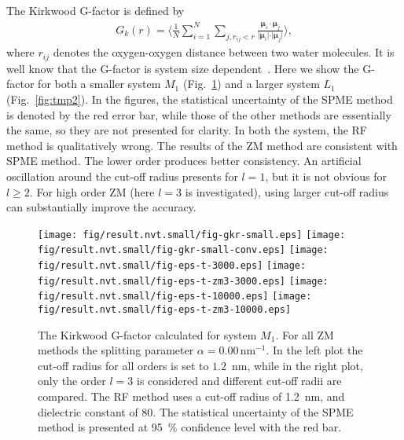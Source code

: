\documentclass[aip,jcp,a4paper,preprint,unsortedaddress,onecolumn,fleqn]{revtex4-1}
\newcommand{\systemmb}{M_1}
\newcommand{\systemlb}{L_1}
\begin{document}
The Kirkwood G-factor is defined by~\cite{vanderSpoel2006origin}
\begin{align}
  G_k(r) =
  \Big\langle
  \frac 1N
  \sum_{i=1}^N \sum_{j, r_{ij} < r}
  \frac {\boldsymbol\mu_i \cdot \boldsymbol\mu_j}{\vert \boldsymbol\mu_i\vert \cdot \vert\boldsymbol\mu_j\vert}
  \Big\rangle,
\end{align}
where $r_{ij}$ denotes the oxygen-oxygen distance between two water
molecules.  It is well know that the G-factor is system size
dependent~\cite{vanderSpoel2006origin}. Here we show the G-factor for
both a smaller system $\systemmb$ (Fig.~\ref{fig:tmp1}) and a larger system $\systemlb$
(Fig.~\ref{fig:tmp2}).  In the figures, the statistical uncertainty of
the SPME method is denoted by the red error bar, while those of the
other methods are essentially the same, so they are not presented for
clarity.  In both the system, the RF method is qualitatively
wrong. The results of the ZM method are consistent with SPME
method. The lower order produces better consistency.  An artificial
oscillation around the cut-off radius presents for $l=1$, but it is
not obvious for $l\geq 2$.  For high order ZM (here $l=3$ is investigated),
using larger cut-off radius can substantially improve the accuracy.

\begin{figure}
  \centering
  \texttt{[image: fig/result.nvt.small/fig-gkr-small.eps]}
  \texttt{[image: fig/result.nvt.small/fig-gkr-small-conv.eps]}
  \texttt{[image: fig/result.nvt.small/fig-eps-t-3000.eps]}
  \texttt{[image: fig/result.nvt.small/fig-eps-t-zm3-3000.eps]}
  \texttt{[image: fig/result.nvt.small/fig-eps-t-10000.eps]}
  \texttt{[image: fig/result.nvt.small/fig-eps-t-zm3-10000.eps]}
  \caption{The Kirkwood G-factor calculated for system $\systemmb$.
    For all ZM methods the splitting parameter $\alpha = 0.00\,\textrm{nm}^{-1}$.
    In the left plot the cut-off radius for all orders is set to $1.2$~nm, while
    in the right plot, only the order $l=3$ is considered and different cut-off radii are compared.
    The RF method uses a cut-off radius of 1.2~nm, and dielectric constant of 80.
    The statistical uncertainty of the SPME method is presented at 95~\% confidence level with the red bar.
  }
  \label{fig:tmp1}
\end{figure}
\end{document}
